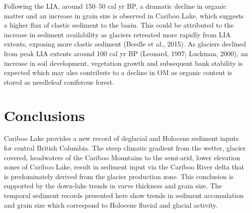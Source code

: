 \documentclass[
  letterpaper,
  DIV=11,
  numbers=noendperiod]{scrartcl}
\begin{document}
Following the LIA, around 150--50 cal yr BP, a dramatic decline in
organic matter and an increase in grain size is observed in Cariboo
Lake, which suggests a higher flux of clastic sediment to the basin.
This could be attributed to the increase in sediment availability as
glaciers retreated more rapidly from LIA extents, exposing more clastic
sediment (Beedle et al., 2015). As glaciers declined from peak LIA
extents around 100 cal yr BP (Leonard, 1997; Luckman, 2000), an increase
in soil development, vegetation growth and subsequent bank stability is
expected which may also contribute to a decline in OM as organic content
is stored as needleleaf coniferous forest.

\section{Conclusions}\label{conclusions}

Cariboo Lake provides a new record of deglacial and Holocene sediment
inputs for central British Columbia. The steep climatic gradient from
the wetter, glacier covered, headwaters of the Cariboo Mountains to the
semi-arid, lower elevation zones of Cariboo Lake, result in sediment
input via the Cariboo River delta that is predominately derived from the
glacier production zone. This conclusion is supported by the down-lake
trends in varve thickness and grain size. The temporal sediment records
presented here show trends in sediment accumulation and grain size which
correspond to Holocene fluvial and glacial activity.
\end{document}
